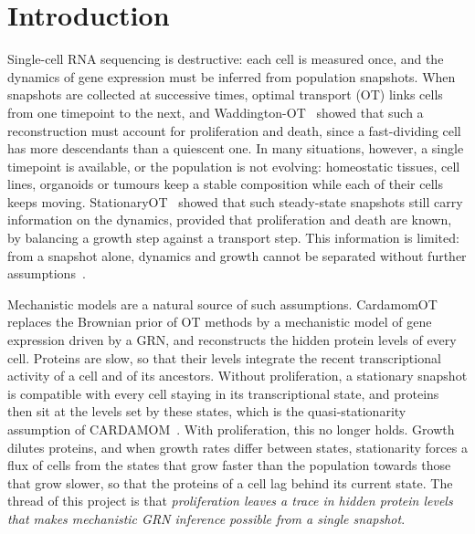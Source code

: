 \documentclass[a4paper, 11pt]{article}
\theoremstyle{plain}
\theoremstyle{remark}
\begin{document}
\tableofcontents

\section{Introduction}\label{sec:intro}

Single-cell RNA sequencing is destructive: each cell is measured once, and the dynamics of gene expression must be inferred from population snapshots. When snapshots are collected at successive times, optimal transport (OT) links cells from one timepoint to the next, and Waddington-OT~\cite{schiebinger2019optimal} showed that such a reconstruction must account for proliferation and death, since a fast-dividing cell has more descendants than a quiescent one. In many situations, however, a single timepoint is available, or the population is not evolving: homeostatic tissues, cell lines, organoids or tumours keep a stable composition while each of their cells keeps moving. StationaryOT~\cite{zhang2021stationaryot} showed that such steady-state snapshots still carry information on the dynamics, provided that proliferation and death are known, by balancing a growth step against a transport step. This information is limited: from a snapshot alone, dynamics and growth cannot be separated without further assumptions~\cite{weinreb2018fundamental}.

Mechanistic models are a natural source of such assumptions. CardamomOT~\cite{mauge2026cardamomot} replaces the Brownian prior of OT methods by a mechanistic model of gene expression driven by a GRN, and reconstructs the hidden protein levels of every cell. Proteins are slow, so that their levels integrate the recent transcriptional activity of a cell and of its ancestors. Without proliferation, a stationary snapshot is compatible with every cell staying in its transcriptional state, and proteins then sit at the levels set by these states, which is the quasi-stationarity assumption of CARDAMOM~\cite{ventre2023one}. With proliferation, this no longer holds. Growth dilutes proteins, and when growth rates differ between states, stationarity forces a flux of cells from the states that grow faster than the population towards those that grow slower, so that the proteins of a cell lag behind its current state. The thread of this project is that \emph{proliferation leaves a trace in hidden protein levels that makes mechanistic GRN inference possible from a single snapshot}.
\end{document}
